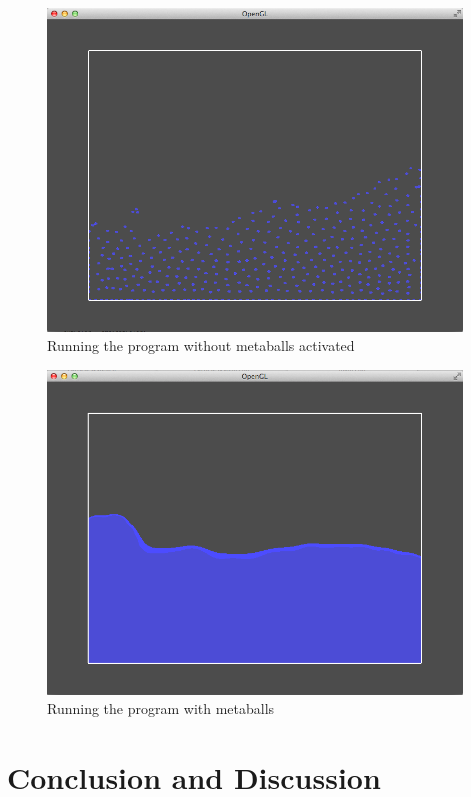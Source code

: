 \documentclass[a4paper,12pt,twoside,final]{report}
\begin{document}
\begin{figure}[H]
\begin{center}
    \includegraphics[width=11cm]{figs/image_2.png} 
\end{center}
\caption{Running the program without metaballs activated}
\label{model_block}
\end{figure}

\begin{figure}[H]
\begin{center}
    \includegraphics[width=11cm]{figs/image_1.png} 
\end{center}
\caption{Running the program with metaballs}
\label{model_block}
\end{figure}



\chapter{Conclusion and Discussion}
\end{document}
